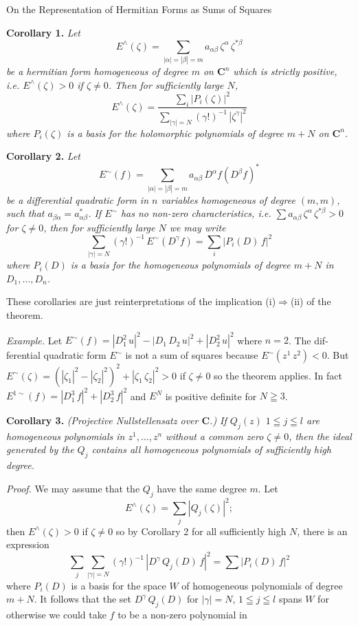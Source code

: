 On the Representation of Hermitian Forms as Sums of Squares 

\textbf{Corollary 1.} \emph{Let}
\[ E^{\wedge}(\zeta)=\sum_{|\alpha|=|\beta|=m} a_{\alpha\beta}\,\zeta^{\alpha}\,\zeta^{*\beta} \]
\emph{be a hermitian form homogeneous of degree $m$ on $\mathbf{C}^n$ which is strictly
positive, i.e. $E^{\wedge}(\zeta)>0$ if $\zeta\neq 0$. Then for sufficiently large $N$,}
\[ E^{\wedge}(\zeta)=\frac{\sum\limits_{i}|P_i(\zeta)|^2}{\sum\limits_{|\gamma|=N}(\gamma!)^{-1}\,|\zeta^{\gamma}|^2} \]
\emph{where $P_i(\zeta)$ is a basis for the holomorphic polynomials of degree $m+N$ on $\mathbf{C}^n$.}

\textbf{Corollary 2.} \emph{Let}
\[ E^{\sim}(f)=\sum_{|\alpha|=|\beta|=m} a_{\alpha\beta}\,D^{\alpha}f(D^{\beta}f)^* \]
\emph{be a differential quadratic form in $n$ variables homogeneous of degree
$(m,m)$, such that $a_{\beta\alpha}=a^*_{\alpha\beta}$. If $E^{\sim}$ has no non-zero characteristics, i.e.
$\sum a_{\alpha\beta}\,\zeta^{\alpha}\,\zeta^{*\beta}>0$ for $\zeta\neq 0$, then for sufficiently large $N$ we may write}
\[ \sum_{|\gamma|=N}(\gamma!)^{-1}\,E^{\sim}(D^{\gamma}f)=\sum_{i}|P_i(D)\,f|^2 \]
\emph{where $P_i(D)$ is a basis for the homogeneous polynomials of degree $m+N$
in $D_1,\dots,D_n$.}

These corollaries are just reinterpretations of the implication (i)$\Rightarrow$(ii)
of the theorem.

\emph{Example.} Let $E^{\sim}(f)=|D_1^2\,u|^2-|D_1\,D_2\,u|^2+|D_2^2\,u|^2$ where $n=2$. The dif-%
ferential quadratic form $E^{\sim}$ is not a sum of squares because $E^{\sim}(z^1\,z^2)<0$.
But $E^{\sim}(\zeta)=(|\zeta_1|^2-|\zeta_2|^2)^2+|\zeta_1\,\zeta_2|^2>0$ if $\zeta\neq 0$ so the theorem applies.
In fact $E^{1\sim}(f)=|D_1^3\,f|^2+|D_2^3\,f|^2$ and $E^N$ is positive definite for $N\geqq 3$.

\textbf{Corollary 3.} \emph{(Projective Nullstellensatz over $\mathbf{C}$.) If $Q_j(z)$ $1\leqq j\leqq l$ are
homogeneous polynomials in $z^1,\dots,z^n$ without a common zero $\zeta\neq 0$, then
the ideal generated by the $Q_j$ contains all homogeneous polynomials of
sufficiently high degree.}

\emph{Proof.} We may assume that the $Q_j$ have the same degree $m$. Let
\[ E^{\wedge}(\zeta)=\sum_{j}|Q_j(\zeta)|^2; \]
then $E^{\wedge}(\zeta)>0$ if $\zeta\neq 0$ so by Corollary 2 for all sufficiently high $N$, there
is an expression
\[ \sum_{j}\sum_{|\gamma|=N}(\gamma!)^{-1}\,|D^{\gamma}\,Q_j(D)\,f|^2=\sum|P_i(D)\,f|^2 \]
where $P_i(D)$ is a basis for the space $W$ of homogeneous polynomials
of degree $m+N$. It follows that the set $D^{\gamma}\,Q_j(D)$ for $|\gamma|=N$, $1\leqq j\leqq l$
spans $W$ for otherwise we could take $f$ to be a non-zero polynomial in

